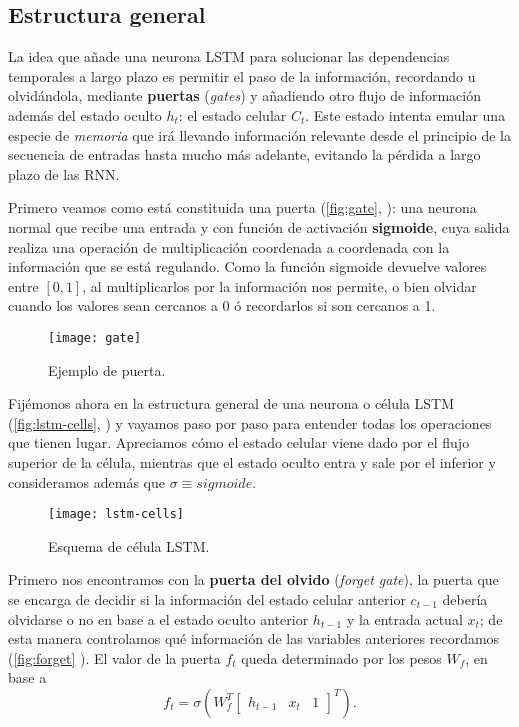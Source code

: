 \subsection{Estructura general}

La idea que añade una neurona LSTM para solucionar las dependencias temporales a largo plazo es permitir el paso de la información, recordando u olvidándola, mediante \textbf{puertas} (\emph{gates}) y añadiendo otro flujo de información además del estado oculto $h_t$: el estado celular $C_t$. Este estado intenta emular una especie de \emph{memoria} que irá llevando información relevante desde el principio de la secuencia de entradas hasta mucho más adelante, evitando la pérdida a largo plazo de las RNN.

Primero veamos como está constituida una puerta (\autoref{fig:gate}, \cite{christopher2015lstm}): una neurona normal que recibe una entrada y con función de activación \textbf{sigmoide}, cuya salida realiza una operación de multiplicación coordenada a coordenada con la información que se está regulando. Como la función sigmoide devuelve valores entre $[0, 1]$, al multiplicarlos por la información nos permite, o bien olvidar cuando los valores sean cercanos a 0 ó recordarlos si son cercanos a 1.

\begin{figure}[htpb]
  \centering
  \texttt{[image: gate]}
  \caption{Ejemplo de puerta.}
  \label{fig:gate}
\end{figure}

Fijémonos ahora en la estructura general de una neurona o célula LSTM (\autoref{fig:lstm-cells}, \cite{christopher2015lstm}) y vayamos paso por paso para entender todas los operaciones que tienen lugar. Apreciamos cómo el estado celular viene dado por el flujo superior de la célula, mientras que el estado oculto entra y sale por el inferior y consideramos además que $\sigma \equiv sigmoide$.

\begin{figure}[htpb]
  \centering
  \texttt{[image: lstm-cells]}
  \caption{Esquema de célula LSTM.}
  \label{fig:lstm-cells}
\end{figure}

Primero nos encontramos con la \textbf{puerta del olvido} (\emph{forget gate}), la puerta que se encarga de decidir si la información del estado celular anterior $c_{t-1}$ debería olvidarse o no en base a el estado oculto anterior $h_{t-1}$ y la entrada actual $x_t$; de esta manera controlamos qué información de las variables anteriores recordamos (\autoref{fig:forget} \cite{christopher2015lstm}). El valor de la puerta $f_t$ queda determinado por los pesos $W_f$, en base a
\begin{equation*}
  f_t = \sigma\left(W_f^T \begin{bmatrix} h_{t-1} & x_t & 1 \end{bmatrix}^T \right).
  \label{eq:forget}
\end{equation*}

